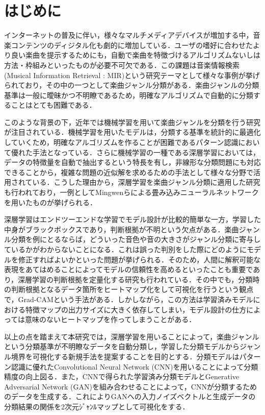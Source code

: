 \chapter{はじめに}
インターネットの普及に伴い，様々なマルチメディアデバイスが増加する中，音楽コンテンツのディジタル化も劇的に増加している．ユーザの嗜好に合わせたより良い楽曲を提示するためにも，自動で楽曲を特徴づけるアルゴリズムないしは方法・枠組みといったものが必要不可欠である．この課題は音楽情報検索(Musical Information Retrieval : MIR)という研究テーマとして様々な事例が挙げられており，その中の一つとして楽曲ジャンル分類がある．楽曲ジャンルの分類基準は一般に曖昧かつ不明瞭であるため，明確なアルゴリズムで自動的に分類することはとても困難である．

このような背景の下，近年では機械学習を用いて楽曲ジャンルを分類を行う研究が注目されている．機械学習を用いたモデルは，分類する基準を統計的に最適化していくため，明確なアルゴリズムを作ることが困難であるパターン認識において優れた手法となっている．さらに機械学習の一種である深層学習においては，データの特徴量を自動で抽出するという特長を有し，非線形な分類問題にも対応できることから，複雑な問題の近似解を求めるための手法として様々な分野で活用されている．こうした理由から，深層学習を楽曲ジャンル分類に適用した研究も行われており，一例としてMingwenらによる畳み込みニューラルネットワークを用いたものが挙げられる\cite{Mingwen}．

深層学習はエンドツーエンドな学習でモデル設計が比較的簡単な一方，学習した中身がブラックボックスであり，判断根拠が不明という欠点がある．楽曲ジャンル分類を例にとるならば，どういった音色や音の大きさがジャンル分類に寄与しているかがわからないことになる．これは誤った判別をした際にどのようにモデルを修正すればよいかといった問題が挙げられる．そのため，人間に解釈可能な表現をあてはめることによってモデルの信頼性を高めるといったことも重要であり，深層学習の判断根拠を定量化する研究も行われている．その中でも，分類時の判断根拠となるデータ箇所をヒートマップ化をして可視化を行うという観点で，Grad-CAMという手法がある\cite{gradcam}．しかしながら，この方法は学習済みモデルにおける特徴マップの出力サイズに大きく依存してしまい，モデル設計の仕方によっては意味のないヒートマップを作ってしまうことがある．


以上の点を踏まえて本研究では，深層学習を用いることによって，楽曲ジャンルという分類基準が不明瞭なデータを自動分類し，学習した分類モデルからジャンル境界を可視化する新規手法を提案することを目的とする．分類モデルはパターン認識に優れたConvolutional Neural Network (CNN)を用いることによって分類精度の向上図る．また，CNNで得られた学習済み分類モデルとGenerative Adversarial Network (GAN)を組み合わせることによって，CNNが分類するためのデータを生成する．これによりGANへの入力ノイズベクトルと生成データの分類結果の関係を2次元ｼﾞｬﾝﾙマップとして可視化をする．


